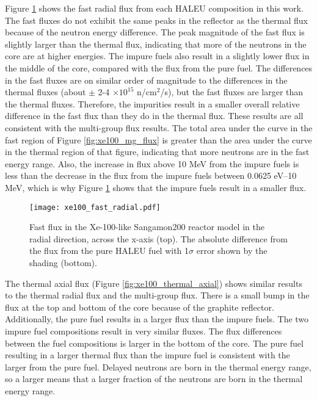 Figure \ref{fig:xe100_fast_radial} shows the fast radial flux from 
each \gls{HALEU} composition in this work. The fast fluxes do not 
exhibit the same peaks in the reflector as the thermal flux 
because of the neutron energy difference. The peak magnitude of 
the fast flux is slightly 
larger than the thermal flux, indicating that more of the neutrons 
in the core are at higher energies. The impure fuels also result in a 
slightly lower flux in the middle of the core, compared with the  
flux from the pure fuel. The differences in the fast fluxes are on similar 
order of magnitude to the differences in the thermal fluxes (about $\pm$ 
2-4 $\times 10^{15}$ n/cm$^2$/s), but the fast fluxes are larger than 
the thermal fluxes. Therefore, the impurities result in a smaller overall
relative difference in the fast flux than they do in the thermal 
flux. These results are all consistent with the multi-group flux results. 
The total area under the curve in the fast region of Figure 
\ref{fig:xe100_mg_flux} is greater than the area under the curve 
in the thermal region of that figure, indicating that more neutrons 
are in the fast energy range. Also, the increase in flux above 
10 MeV from the impure fuels is less than the decrease in the flux 
from the impure fuels between 0.0625 eV--10 MeV, which is why 
Figure \ref{fig:xe100_fast_radial} shows that the impure 
fuels result in a smaller flux. 

\begin{figure}[ht]
        \centering 
        \texttt{[image: xe100\_fast\_radial.pdf]}
        \caption{Fast flux in the Xe-100-like Sangamon200 
        reactor model in the radial direction, across the 
        x-axis (top). The absolute difference from the flux from 
        the pure \gls{HALEU} fuel with 1$\sigma$ error shown by 
        the shading (bottom).}
        \label{fig:xe100_fast_radial}
\end{figure}


The thermal axial flux (Figure \ref{fig:xe100_thermal_axial}) shows 
similar results to the thermal radial flux and the multi-group flux. 
There is a small bump in the 
flux at the top and bottom of the core because of the graphite reflector.
Additionally, the pure fuel results in a larger flux than 
the impure fuels. The two impure fuel compositions result in very 
similar fluxes. The flux differences between the fuel compositions is 
larger in the bottom of the core. The pure fuel resulting in a larger 
thermal flux than the impure fuel is consistent with the larger \betaEff 
from the pure fuel. Delayed neutrons are born in the thermal energy range, 
so a larger \betaEff means that a larger fraction of the neutrons are 
born in the thermal energy range. 

